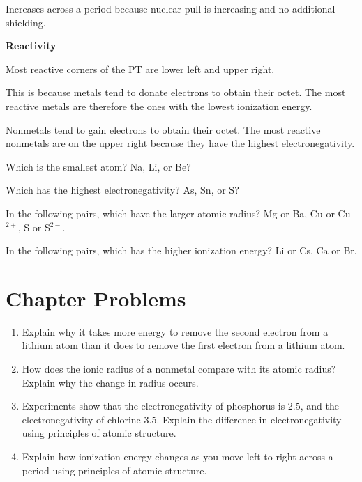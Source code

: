 \documentclass[../hchem.tex]{subfiles}
\begin{document}
Increases across a period because nuclear pull is increasing and no additional shielding.

\textbf{Reactivity}

Most reactive corners of the PT are lower left and upper right.

This is because metals tend to donate electrons to obtain their octet. The most reactive metals are therefore the ones with the lowest ionization energy.

Nonmetals tend to gain electrons to obtain their octet. The most reactive nonmetals are on the upper right because they have the highest electronegativity.

\ex Which is the smallest atom? Na, Li, or Be?

\ex Which has the highest electronegativity? As, Sn, or S?

\ex In the following pairs, which have the larger atomic radius? Mg or Ba, Cu or Cu$^{2+}$, S or S$^{2-}$. 

\ex In the following pairs, which has the higher ionization energy? Li or Cs, Ca or Br.

\section*{Chapter Problems}
\begin{enumerate}
    \item Explain why it takes more energy to remove the second electron from a lithium atom than it does to remove the first electron from a lithium atom.
    \item How does the ionic radius of a nonmetal compare with its atomic radius? Explain why the change in radius occurs.
    \item Experiments show that the electronegativity of phosphorus is 2.5, and the electronegativity of chlorine 3.5. Explain the difference in electronegativity using principles of atomic structure.
    \item Explain how ionization energy changes as you move left to right across a period using principles of atomic structure. 
\end{enumerate}
\end{document}
